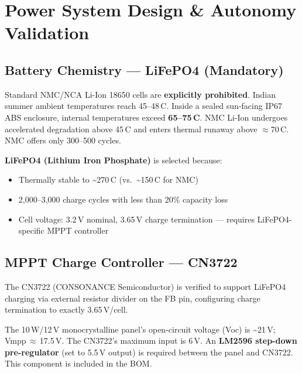 \documentclass[12pt,a4paper]{article}
\begin{document}
\section{Power System Design \& Autonomy Validation}

\subsection{Battery Chemistry --- LiFePO4 (Mandatory)}

\begin{warnbox}
Standard NMC/NCA Li-Ion 18650 cells are \textbf{explicitly prohibited}. Indian summer ambient temperatures reach 45--48\,\textdegree C. Inside a sealed sun-facing IP67 ABS enclosure, internal temperatures exceed \textbf{65--75\,\textdegree C}. NMC Li-Ion undergoes accelerated degradation above 45\,\textdegree C and enters thermal runaway above $\approx$70\,\textdegree C. NMC offers only 300--500 cycles.
\end{warnbox}

\textbf{LiFePO4 (Lithium Iron Phosphate)} is selected because:
\begin{itemize}
    \item Thermally stable to \textasciitilde270\,\textdegree C (vs.\ \textasciitilde150\,\textdegree C for NMC)
    \item 2{,}000--3{,}000 charge cycles with less than 20\% capacity loss
    \item Cell voltage: 3.2\,V nominal, 3.65\,V charge termination --- requires LiFePO4-specific MPPT controller
\end{itemize}

\subsection{MPPT Charge Controller --- CN3722}

The CN3722 (CONSONANCE Semiconductor) is verified to support LiFePO4 charging via external resistor divider on the FB pin, configuring charge termination to exactly 3.65\,V/cell.

\begin{notebox}
The 10\,W/12\,V monocrystalline panel's open-circuit voltage (Voc) is \textasciitilde21\,V; Vmpp\,$\approx$\,17.5\,V. The CN3722's maximum input is 6\,V. An \textbf{LM2596 step-down pre-regulator} (set to 5.5\,V output) is required between the panel and CN3722. This component is included in the BOM.
\end{notebox}
\end{document}
